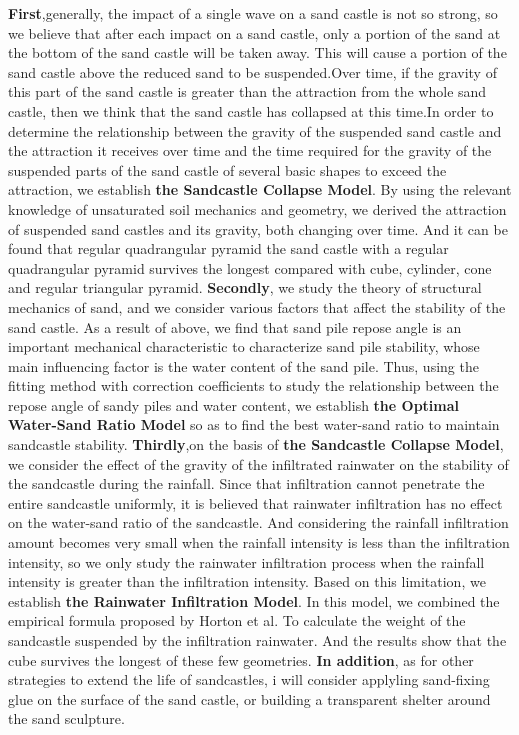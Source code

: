\documentclass[12pt]{article}
\begin{document}
\textbf{First},generally, the impact of a single wave on a sand castle is not so strong, so we believe that after each impact on a sand castle, only a portion of the sand at the bottom of the sand castle will be taken away. This will cause a portion of the sand castle above the reduced sand to be suspended.Over time, if the gravity of this part of the sand castle is greater than the attraction from the whole sand castle, then we think that the sand castle has collapsed at this time.In order to determine the relationship between the gravity of the suspended sand castle and the attraction it receives over time and the time required for the gravity of the suspended parts of the sand castle of several basic shapes to exceed the attraction, we establish \textbf{the Sandcastle Collapse Model}. By using the relevant knowledge of unsaturated soil mechanics and geometry, we derived the attraction of suspended sand castles and its gravity, both changing over time. And it can be found that regular quadrangular pyramid the sand castle with a regular quadrangular pyramid survives the longest compared with cube, cylinder, cone and regular triangular pyramid. \textbf{Secondly}, we study the theory of structural mechanics of sand, and we consider various factors that affect the stability of the sand castle. As a result of above, we find that sand pile repose angle is an important mechanical characteristic to characterize sand pile stability, whose main influencing factor is the water content of the sand pile. Thus, using the fitting method with correction coefficients to study the relationship between the repose angle of sandy piles and water content,  we establish \textbf{the Optimal Water-Sand Ratio Model} so as to find the best water-sand ratio to maintain sandcastle stability. \textbf{Thirdly},on the basis of \textbf{the Sandcastle Collapse Model}, we consider the effect of the gravity of the infiltrated rainwater on the stability of the sandcastle during the rainfall. Since that infiltration cannot penetrate the entire sandcastle uniformly, it is believed that rainwater infiltration has no effect on the water-sand ratio of the sandcastle. And considering the rainfall infiltration amount becomes very small when the rainfall intensity is less than the infiltration intensity, so we only study the rainwater infiltration process when the rainfall intensity is greater than the infiltration intensity. Based on this limitation, we establish \textbf{the Rainwater Infiltration Model}. In this model, we combined the empirical formula proposed by Horton et al. To calculate the weight of the sandcastle suspended by the infiltration rainwater.
And the results show that the cube survives the longest of these few geometries. \textbf{In addition}, as for other strategies to extend the life of sandcastles, i will consider applyling sand-fixing glue on the surface of the sand castle, or building a transparent shelter around the sand sculpture.
\end{document}
